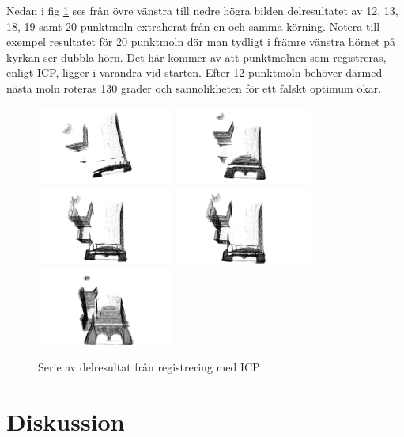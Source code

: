 Nedan i fig \ref{fig:registered_church_serie} ses från övre vänstra till nedre högra bilden delresultatet av 12, 13, 18, 19 samt 20 punktmoln extraherat från en och samma körning. Notera till exempel resultatet för 20 punktmoln där man tydligt i främre vänstra hörnet på kyrkan ser dubbla hörn. Det här kommer av att punktmolnen som registreras, enligt ICP, ligger i varandra vid starten. Efter 12 punktmoln behöver därmed nästa moln roteras 130 grader och sannolikheten för ett falskt optimum ökar.
\begin{figure}[H]
	\centering
	\includegraphics[width=45mm]{figures/12_pc.png}
	\includegraphics[width=45mm]{figures/13_pc.png}
	\includegraphics[width=45mm]{figures/18_pc.png}
	\includegraphics[width=45mm]{figures/19_pc.png}
	\includegraphics[width=45mm]{figures/20_pc.png}
	\caption{Serie av delresultat från registrering med ICP}
	\label{fig:registered_church_serie}
\end{figure}

\section{Diskussion}
\label{sec:discussion-karlsson}

